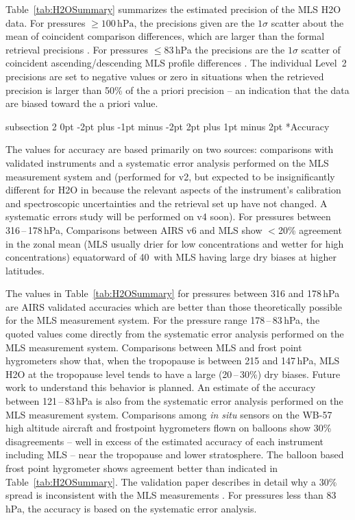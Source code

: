 \documentclass[11pt,draft]{report}
\makeatletter
\renewcommand{\subsection}{\@startsection%
  {subsection}%
  {2}%
  {0pt}%
  {-2pt plus -1pt minus -2pt}%
  {2pt plus 1pt minus 2pt}%
  {\large\sffamily\fontseries{sb}\selectfont\flushleft\color{SectionColor}\figureversion{tabular}}}%
\makeatother
\begin{document}
Table~\ref{tab:H2OSummary} summarizes the estimated precision of the MLS
\thisv H\cs2O data. For pressures $\geq100\,\text{hPa}$, the precisions
given are the $1\sigma$ scatter about the mean of coincident comparison
differences, which are larger than the formal retrieval precisions
\citep{ReadEtal07}.  For pressures $\leq$83\,hPa the precisions are the
$1\sigma$ scatter of coincident ascending/descending MLS profile
differences \citep{LambertEtal07}.  The individual Level~2 precisions
are set to negative values or zero in situations when the retrieved
precision is larger than 50\% of the a priori precision -- an indication
that the data are biased toward the a priori value.

\subsection*{Accuracy}

The values for accuracy are based primarily on two sources: comparisons
with validated instruments and a systematic error analysis performed on
the MLS measurement system \citep{ReadEtal07} and \citep{LambertEtal07}
(performed for v2, but expected to be insignificantly different for
H\cs2O in \thisv because the relevant aspects of the instrument's
calibration and spectroscopic uncertainties and the retrieval set up
have not changed. A systematic errors study will be performed on v4
soon).  For pressures between 316\,--\,178\,hPa, Comparisons between
AIRS v6 and MLS \thisv show $<$20\% agreement in the zonal mean (MLS
usually drier for low concentrations and wetter for high concentrations)
equatorward of 40\degsym\ with MLS having large dry biases at higher
latitudes.

The values in Table~\ref{tab:H2OSummary} for pressures between 316 and
178\,hPa are AIRS validated accuracies which are better than those
theoretically possible for the MLS measurement system. For the pressure
range 178\,--\,83\,hPa, the quoted values come directly from the
systematic error analysis performed on the MLS measurement
system. Comparisons between MLS and frost point hygrometers show that,
when the tropopause is between 215 and 147\,hPa, MLS H\cs2O at the
tropopause level tends to have a large (20\,--\,30\%) dry biases.
Future work to understand this behavior is planned.  An estimate of the
accuracy between 121\,--\,83\,hPa is also from the systematic error
analysis performed on the MLS measurement system.  Comparisons among
\emph{in situ} sensors on the WB-57 high altitude aircraft and
frostpoint hygrometers flown on balloons show 30\% disagreements -- well
in excess of the estimated accuracy of each instrument including MLS --
near the tropopause and lower stratosphere.  The balloon based frost
point hygrometer shows agreement better than indicated in
Table~\ref{tab:H2OSummary}. The validation paper describes in detail why
a 30\% spread is inconsistent with the MLS measurements
\citep{ReadEtal07}.  For pressures less than 83\,hPa, the accuracy is
based on the systematic error analysis.
\end{document}
